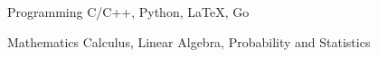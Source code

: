 


\begin{cvskills}


\cvskill
{Programming} %
{C/C++, Python, LaTeX, Go} %


\cvskill
{Mathematics} %
{Calculus, Linear Algebra, Probability and Statistics} %


\end{cvskills}